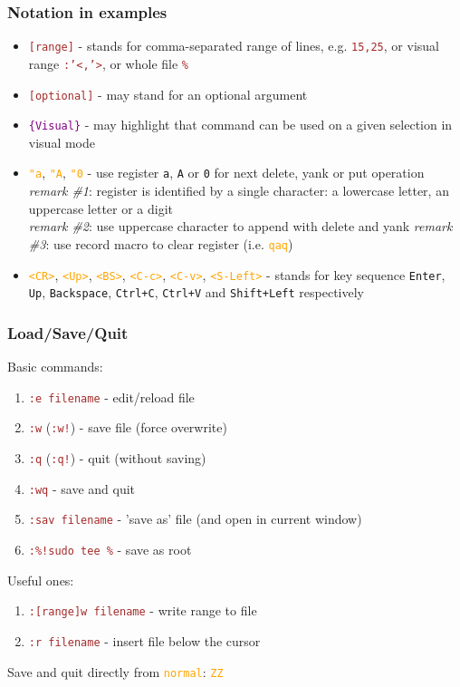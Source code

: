\documentclass{beamer}
\newcommand{\vimnormal}[1]{\texttt{\textcolor{orange}{#1}}}
\newcommand{\vimcommand}[1]{\texttt{\textcolor{brown}{#1}}}
\newcommand{\vimvisual}[1]{\texttt{\textcolor{purple}{#1}}}
\newcommand{\vimkey}[1]{\textless{}#1\textgreater{}}
\begin{document}
\begin{frame}[fragile]
    \frametitle{Notation in examples}
    {\footnotesize
    \begin{itemize}
        \item \vimcommand{[range]} - stands for comma-separated range of lines, e.g. \vimcommand{15,25}, or visual range \vimcommand{:'\textless{},'\textgreater{}}, or whole file \vimcommand{\%}
        \item \vimcommand{[optional]} - may stand for an optional argument
        \item \vimvisual{\{Visual\}} - may highlight that command can be used on a given selection in visual mode
        \item \vimnormal{"a}, \vimnormal{"A}, \vimnormal{"0} - use register \texttt{a}, \texttt{A} or \texttt{0} for next delete, yank or put operation\\
          \textit{remark \#1}: register is identified by a single character: a lowercase letter, an uppercase letter or a digit\\
          \textit{remark \#2}: use uppercase character to append with delete and yank
          \textit{remark \#3}: use record macro to clear register (i.e. \vimnormal{qaq})
        \item \vimnormal{\vimkey{CR}}, \vimnormal{\vimkey{Up}}, \vimnormal{\vimkey{BS}}, \vimnormal{\vimkey{C-c}}, \vimnormal{\vimkey{C-v}}, \vimnormal{\vimkey{S-Left}} - stands for key sequence \texttt{Enter}, \texttt{Up}, \texttt{Backspace}, \texttt{Ctrl+C}, \texttt{Ctrl+V} and \texttt{Shift+Left} respectively
    \end{itemize}
    }
\end{frame}

\begin{frame}
    \frametitle{Load/Save/Quit}
    Basic commands:
    \begin{enumerate}
        \item \vimcommand{:e filename} - edit/reload file
        \item \vimcommand{:w} (\vimcommand{:w!}) - save file (force overwrite)
        \item \vimcommand{:q} (\vimcommand{:q!}) - quit (without saving)
        \item \vimcommand{:wq} - save and quit
        \item \vimcommand{:sav filename} - 'save as' file (and open in current window)
        \item \vimcommand{:\%!sudo tee \%} - save as root
    \end{enumerate}
    Useful ones:
    \begin{enumerate}
        \item \vimcommand{:[range]w filename} - write range to file
        \item \vimcommand{:r filename} - insert file below the cursor
    \end{enumerate}
    Save and quit directly from \vimnormal{normal}: \vimnormal{ZZ}
\end{frame}
\end{document}
